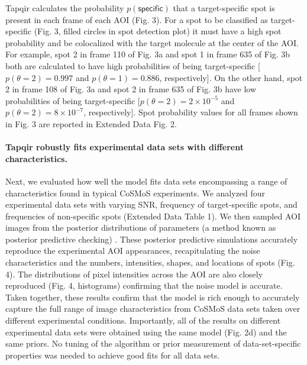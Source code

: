 Tapqir calculates the probability $p(\mathsf{specific})$ that a target-specific spot is present in each frame of each AOI (Fig. 3).  For a spot to be classified as target-specific (Fig. 3, filled circles in spot detection plot) it must have a high spot probability and be colocalized with the target molecule at the center of the AOI. For example, spot 2 in frame 110 of Fig. 3a and spot 1 in frame 635 of Fig. 3b both are calculated to have high probabilities of being target-specific [$p(\theta=2) = 0.997$ and $p(\theta=1) = 0.886$, respectively]. On the other hand, spot 2 in frame 108 of Fig. 3a and spot 2 in frame 635 of Fig. 3b have low probabilities of being target-specific [$p(\theta=2) = 2 \times 10^{-5}$ and $p(\theta=2) = 8 \times 10^{-7}$, respectively]. Spot probability values for all frames shown in Fig. 3 are reported in Extended Data Fig. 2.  

\paragraph{Tapqir robustly fits experimental data sets with different characteristics.}
Next, we evaluated how well the model fits data sets encompassing a range of characteristics found in typical CoSMoS experiments. We analyzed four experimental data sets with varying SNR, frequency of target-specific spots, and frequencies of non-specific spots (Extended Data Table 1). We then sampled AOI images from the posterior distributions of parameters (a method known as posterior predictive checking) \cite{Gelman2013-ro}. These posterior predictive simulations accurately reproduce the experimental AOI appearances, recapitulating the noise characteristics and the numbers, intensities, shapes, and locations of spots (Fig. 4).  The distributions of pixel intensities across the AOI are also closely reproduced (Fig. 4, histograms) confirming that the noise model is accurate. Taken together, these results confirm that the model is rich enough to accurately capture the full range of image characteristics from CoSMoS data sets taken over different experimental conditions.  Importantly, all of the results on different experimental data sets were obtained using the same model (Fig. 2d) and the same priors.  No tuning of the algorithm or prior measurement of data-set-specific properties was needed to achieve good fits for all data sets.

